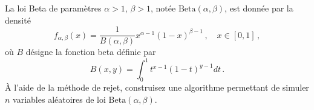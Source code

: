 \documentclass[11pt]{td_um}
\newcommand{\vas}{variables aléatoires\xspace}
\begin{document}
\begin{exo}{}
	La loi Beta de paramètres $\alpha > 1$, $\beta > 1$, notée $\text{Beta}(\alpha, \beta)$, est donnée par la densité
	\[
	f_{\alpha, \beta}(x)
	= \dfrac{1}{B(\alpha,\beta)} x^{\alpha-1} (1-x)^{\beta-1}\,,
	\quad x \in [0,1]\,,
	\]
	où $B$ désigne la fonction beta définie par
	\[
	B (x,y) = \int_0^1 t^{x-1} (1-t)^{y-1} dt\,.
	\]
	À l'aide de la méthode de rejet, construisez une algorithme permettant de simuler $n$ \vas de loi $\text{Beta}(\alpha,\beta)$.





\end{exo}
\end{document}
